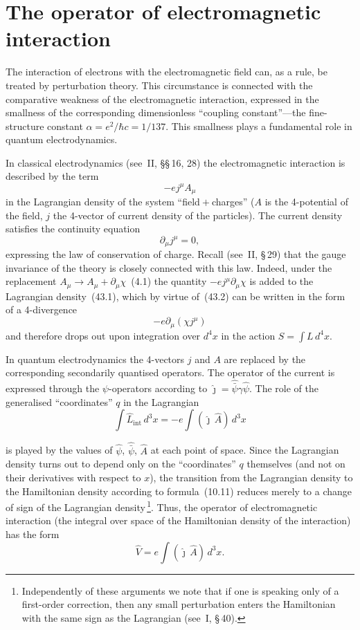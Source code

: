 \section{The operator of electromagnetic interaction}

The interaction of electrons with the electromagnetic field can, as a rule, be treated by perturbation theory. This circumstance is connected with the comparative weakness of the electromagnetic interaction, expressed in the smallness of the corresponding dimensionless ``coupling constant''---the fine-structure constant $\alpha = e^2/\hbar c = 1/137$. This smallness plays a fundamental role in quantum electrodynamics.

In classical electrodynamics (see~II, \S\S\,16, 28) the electromagnetic interaction is described by the term
\begin{equation}
-ej^\mu A_\mu
\tag{43.1}
\end{equation}
in the Lagrangian density of the system ``field${}+{}$charges'' ($A$ is the 4-potential of the field, $j$ the 4-vector of current density of the particles). The current density satisfies the continuity equation
\begin{equation}
\partial_\mu j^\mu = 0,
\tag{43.2}
\end{equation}
expressing the law of conservation of charge. Recall (see~II, \S\,29) that the gauge invariance of the theory is closely connected with this law. Indeed, under the replacement $A_\mu \to A_\mu + \partial_\mu\chi$~(4.1) the quantity $-ej^\mu\partial_\mu\chi$ is added to the Lagrangian density~(43.1), which by virtue of~(43.2) can be written in the form of a 4-divergence
\[
-e\partial_\mu(\chi j^\mu)
\]
and therefore drops out upon integration over $d^4x$ in the action $S = \int L\,d^4x$.

In quantum electrodynamics the 4-vectors $j$ and $A$ are replaced by the corresponding secondarily quantised operators. The operator of the current is expressed through the $\psi$-operators according to $\widehat\jmath = \widehat{\bar\psi}\gamma\widehat\psi$. The role of the generalised ``coordinates'' $q$ in the Lagrangian
\[
\int\widehat L_{\mathrm{int}}\,d^3x = -e\int(\widehat\jmath\,\widehat A)\,d^3x
\]

is played by the values of $\widehat\psi$, $\widehat{\bar\psi}$, $\widehat A$ at each point of space. Since the Lagrangian density turns out to depend only on the ``coordinates'' $q$ themselves (and not on their derivatives with respect to $x$), the transition from the Lagrangian density to the Hamiltonian density according to formula~(10.11) reduces merely to a change of sign of the Lagrangian density\,\footnote{Independently of these arguments we note that if one is speaking only of a first-order correction, then any small perturbation enters the Hamiltonian with the same sign as the Lagrangian (see~I, \S\,40).}. Thus, the operator of electromagnetic interaction (the integral over space of the Hamiltonian density of the interaction) has the form
\begin{equation}
\widehat V = e\int(\widehat\jmath\,\widehat A)\,d^3x.
\tag{43.3}
\end{equation}


